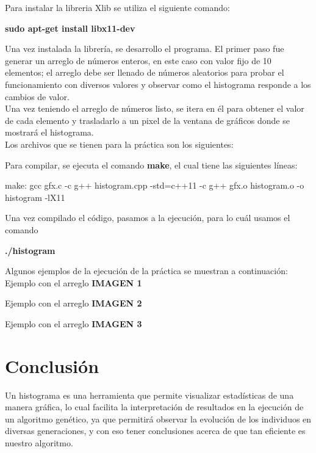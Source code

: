 \documentclass[11pt,letterpaper]{article}
\begin{document}
Para instalar la libreria Xlib se utiliza el siguiente comando:\\
\begin{center}
	\textbf{sudo apt-get install libx11-dev}
\end{center}

Una vez instalada la librería, se desarrollo el programa. El primer paso fue generar un arreglo de números enteros, en este caso con valor fijo de 10 elementos; el arreglo debe ser llenado de números aleatorios para probar el funcionamiento con diversos valores y observar como el histograma responde a los cambios de valor.\\

Una vez teniendo el arreglo de números listo, se itera en él para obtener el valor de cada elemento y trasladarlo a un pixel de la ventana de gráficos donde se mostrará el histograma. \\

Los archivos que se tienen para la práctica son los siguientes:

Para compilar, se ejecuta el comando \textbf{make}, el cual tiene las siguientes líneas:
\begin{center}
	make:
	gcc gfx.c -c
	g++ histogram.cpp -std=c++11 -c
	g++ gfx.o histogram.o -o histogram -lX11
\end{center}

Una vez compilado el código, pasamos a la ejecución, para lo cuál usamos el comando 
\begin{center}
	\textbf{./histogram}
\end{center}

Algunos ejemplos de la ejecución de la práctica se muestran a continuación:\\

Ejemplo con el arreglo \left[28,49,49,29,15,43,18,37,44,24  \right]
\textbf{IMAGEN 1}


Ejemplo con el arreglo \left[18,27,42,18,31,25,14,6,8,5 \right]
\textbf{IMAGEN 2}


Ejemplo con el arreglo \left[26,29,35,28,43,28,42,24,247 \right]
\textbf{IMAGEN 3}

\section*{Conclusión}
Un histograma es una herramienta que permite visualizar estadísticas de una manera gráfica, lo cual facilita la interpretación de resultados en la ejecución de un algoritmo genético, ya que permitirá observar la evolución de los individuos en diversas generaciones, y con eso tener conclusiones acerca de que tan eficiente es nuestro algoritmo.
\end{document}
